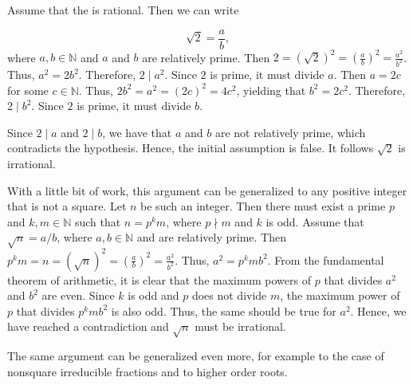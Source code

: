 \documentclass[12pt]{article}
\def\N{{\mathbb N}}
\begin{document}

Assume that the  is rational.  Then we can write

\begin{equation*}
 \sqrt{2} = \frac{a}{b},
\end{equation*}
where $a,b\in\N$ and $a$ and $b$ are relatively prime.  Then $\displaystyle 2=(\sqrt{2})^2=\left(\frac{a}{b}\right)^2=\frac{a^2}{b^2}$.  Thus, $a^2=2b^2$.  Therefore, $2\mid a^2$.  Since $2$ is prime, it must divide $a$.  Then $a=2c$ for some $c\in\N$.  Thus, $2b^2=a^2=(2c)^2=4c^2$, yielding that $b^2=2c^2$.  Therefore, $2\mid b^2$.  Since $2$ is prime, it must divide $b$.

Since $2\mid a$ and $2\mid b$, we have that $a$ and $b$ are not relatively prime, which contradicts the hypothesis.  Hence, the initial assumption is false.  It follows $\sqrt{2}$ is irrational.

With a little bit of work, this argument can be generalized to any positive integer that is not a square.  Let $n$ be such an integer.  Then there must exist a prime $p$ and $k,m\in\N$ such that $n=p^km$, where $p\nmid m$ and $k$ is odd. Assume that $\sqrt{n}=a/b$, where $a,b\in\N$ and are relatively prime. Then $\displaystyle p^km=n=(\sqrt{n})^2=\left(\frac{a}{b}\right)^2=\frac{a^2}{b^2}$. Thus, $a^2=p^kmb^2$.  From the fundamental theorem of arithmetic, it is clear that the maximum powers of $p$ that divides $a^2$ and $b^2$ are even.  Since $k$ is odd and $p$ does not divide $m$, the maximum power of $p$ that divides $p^kmb^2$ is also odd.  Thus, the same should be true for $a^2$.  Hence, we have reached a contradiction and $\sqrt{n}$ must be irrational.

The same argument can be generalized even more, for example to the case of nonsquare irreducible fractions and to higher order roots.
\end{document}
